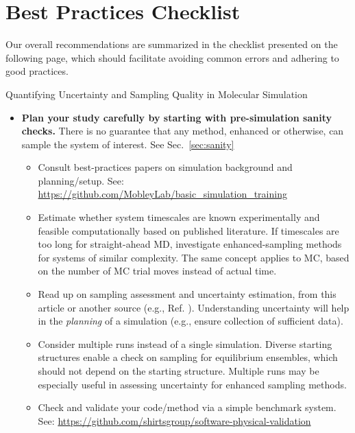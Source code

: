\section{Best Practices Checklist}

Our overall recommendations are summarized in the checklist  presented on the following page, which should facilitate avoiding common errors and adhering to good practices.

\begin{Checklists*}[p!]
\begin{checklist}{Quantifying Uncertainty and Sampling Quality in Molecular Simulation}
\begin{itemize}
\item
  \textbf{Plan your study carefully by starting with pre-simulation sanity checks.}
  There is no guarantee that any method, enhanced or otherwise, can sample the system of interest.
  See Sec.\ \ref{sec:sanity}
    \begin{itemize}
    \item Consult best-practices papers on simulation background and planning/setup.
      See: \url{https://github.com/MobleyLab/basic_simulation_training}
    \item Estimate whether system timescales are known experimentally and feasible computationally based on published literature.
      If timescales are too long for straight-ahead MD, investigate enhanced-sampling methods for systems of similar complexity.
      The same concept applies to MC, based on the number of MC trial moves instead of actual time.
    \item Read up on sampling assessment and uncertainty estimation, from this article or another source (e.g., Ref. \cite{Grossfield2009}).
      Understanding uncertainty will help in the \emph{planning} of a simulation (e.g., ensure collection of sufficient data).
    \item Consider multiple runs instead of a single simulation.
      Diverse starting structures enable a check on sampling for equilibrium ensembles, which should not depend on the starting structure.
      Multiple runs may be especially useful in assessing uncertainty for enhanced sampling methods.
    \item Check and validate your code/method via a simple benchmark system.
      See: \url{https://github.com/shirtsgroup/software-physical-validation}
    \end{itemize}
    \vspace{-0.325\baselineskip} %
    

\end{itemize}
\end{checklist}
\end{Checklists*}

